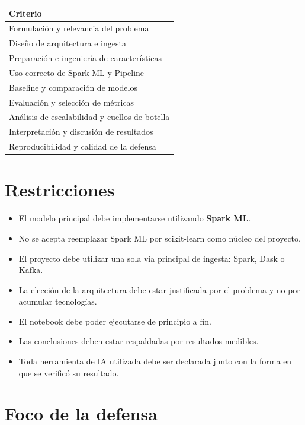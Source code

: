 \documentclass[11pt,a4paper]{article}
\begin{document}
\noindent
\renewcommand{\arraystretch}{1.15}
\begin{tabularx}{\textwidth}{X}
  \toprule
  \textbf{Criterio} \\
  \midrule
  Formulación y relevancia del problema \\
  Diseño de arquitectura e ingesta \\
  Preparación e ingeniería de características \\
  Uso correcto de Spark ML y Pipeline \\
  Baseline y comparación de modelos \\
  Evaluación y selección de métricas \\
  Análisis de escalabilidad y cuellos de botella \\
  Interpretación y discusión de resultados \\
  Reproducibilidad y calidad de la defensa \\
  \bottomrule
\end{tabularx}

\section{Restricciones}

\begin{itemize}
  \item El modelo principal debe implementarse utilizando \textbf{Spark ML}.
  \item No se acepta reemplazar Spark ML por scikit-learn como núcleo del proyecto.
  \item El proyecto debe utilizar una sola vía principal de ingesta: Spark, Dask o Kafka.
  \item La elección de la arquitectura debe estar justificada por el problema y no por
        acumular tecnologías.
  \item El notebook debe poder ejecutarse de principio a fin.
  \item Las conclusiones deben estar respaldadas por resultados medibles.
  \item Toda herramienta de IA utilizada debe ser declarada junto con la forma en que se
        verificó su resultado.
\end{itemize}

\section{Foco de la defensa}
\end{document}
